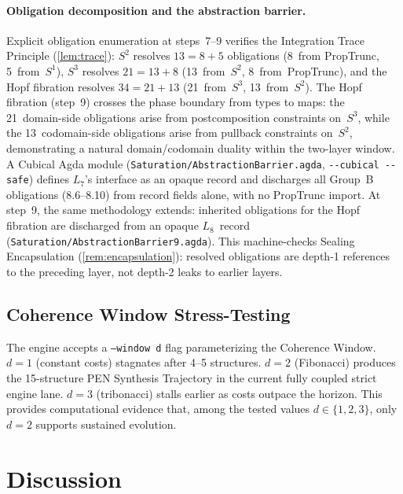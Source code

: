 \documentclass[11pt,a4paper]{article}
\theoremstyle{plain}
\theoremstyle{definition}
\theoremstyle{remark}
\begin{document}
\paragraph{Obligation decomposition and the abstraction barrier.}
Explicit obligation enumeration at steps~7--9 verifies the Integration Trace Principle (\cref{lem:trace}):
$S^2$ resolves $13 = 8 + 5$ obligations (8~from PropTrunc, 5~from~$S^1$), $S^3$ resolves $21 = 13 + 8$ (13~from~$S^2$, 8~from~PropTrunc), and the Hopf fibration resolves $34 = 21 + 13$ (21~from~$S^3$, 13~from~$S^2$).
The Hopf fibration (step~9) crosses the phase boundary from types to maps: the 21~domain-side obligations arise from postcomposition constraints on~$S^3$, while the 13~codomain-side obligations arise from pullback constraints on~$S^2$, demonstrating a natural domain/codomain duality within the two-layer window.
A Cubical Agda module (\texttt{Saturation/AbstractionBarrier.agda}, \texttt{-{}-cubical -{}-safe}) defines $L_7$'s interface as an opaque record and discharges all Group~B obligations (8.6--8.10) from record fields alone, with no PropTrunc import.
At step~9, the same methodology extends: inherited obligations for the Hopf fibration are discharged from an opaque $L_8$~record (\texttt{Saturation/AbstractionBarrier9.agda}).
This machine-checks Sealing Encapsulation (\cref{rem:encapsulation}): resolved obligations are depth-1 references to the preceding layer, not depth-2 leaks to earlier layers.

\subsection{Coherence Window Stress-Testing}

The engine accepts a \texttt{--window d} flag parameterizing the Coherence Window.
$d = 1$ (constant costs) stagnates after 4--5 structures.
$d = 2$ (Fibonacci) produces the 15-structure PEN Synthesis Trajectory in the current fully coupled strict engine lane.
$d = 3$ (tribonacci) stalls earlier as costs outpace the horizon.
This provides computational evidence that, among the tested values $d \in \{1, 2, 3\}$, only $d = 2$ supports sustained evolution.

\section{Discussion}
\label{sec:discussion}
\end{document}
